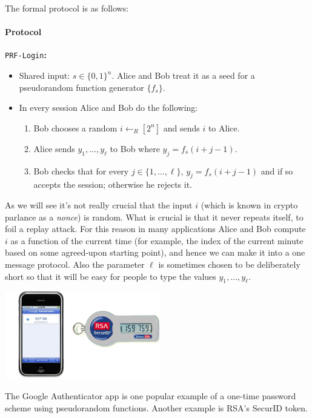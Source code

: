 The formal protocol is as follows:

\paragraph{Protocol} \texttt{PRF-Login}\textbf{:}

\begin{itemize}
\tightlist
\item
  Shared input: \(s\in\{0,1\}^n\). Alice and Bob treat it as a seed for
  a pseudorandom function generator \(\{ f_s \}\).
\item
  In every session Alice and Bob do the following:

  \begin{enumerate}
  \def\labelenumi{\arabic{enumi}.}
  \tightlist
  \item
    Bob chooses a random \(i\leftarrow_R[2^n]\) and sends \(i\) to
    Alice.
  \item
    Alice sends \(y_1,\ldots,y_\ell\) to Bob where \(y_j = f_s(i+j-1)\).
  \item
    Bob checks that for every \(j\in\{1,\ldots,\ell\}\),
    \(y_j = f_s(i+j-1)\) and if so accepts the session; otherwise he
    rejects it.
  \end{enumerate}
\end{itemize}

As we will see it's not really crucial that the input \(i\) (which is
known in crypto parlance as a \emph{nonce}) is random. What is crucial
is that it never repeats itself, to foil a replay attack. For this
reason in many applications Alice and Bob compute \(i\) as a function of
the current time (for example, the index of the current minute based on
some agreed-upon starting point), and hence we can make it into a one
message protocol. Also the parameter \(\ell\) is sometimes chosen to be
deliberately short so that it will be easy for people to type the values
\(y_1,\ldots,y_\ell\).

\begin{marginfigure}
\centering
\includegraphics[width=\linewidth, height=1.5in, keepaspectratio]{../figure/google-authenticator.jpg}
\caption{The Google Authenticator app is one popular example of a
one-time password scheme using pseudorandom functions. Another example
is RSA's SecurID token.}
\label{tmplabelfig}
\end{marginfigure}

